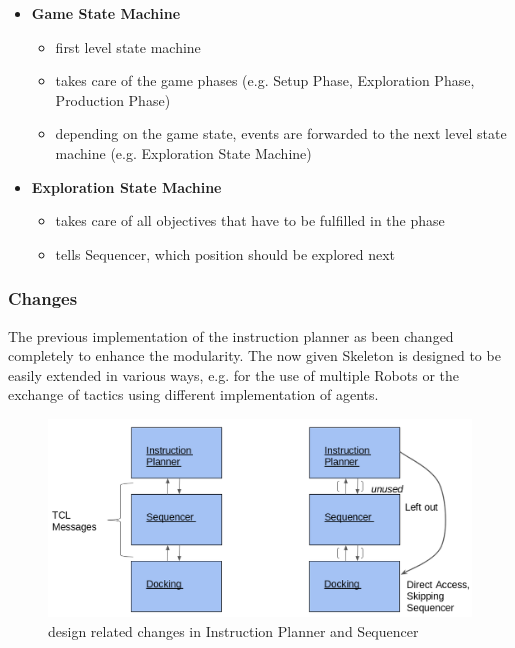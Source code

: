 \begin{itemize}
    \item \textbf{Game State Machine}
    \begin{itemize}
        \item first level state machine
        \item takes care of the game phases (e.g. Setup Phase, Exploration Phase, Production Phase)
         \item depending on the game state, events are forwarded to the next level state machine (e.g. Exploration State Machine)
    \end{itemize}
    \item \textbf{Exploration State Machine}
    \begin{itemize}
        \item takes care of all objectives that have to be fulfilled in the phase
        \item tells Sequencer, which position should be explored next
    \end{itemize}
\end{itemize}
\newpage

\subsubsection{Changes}
The previous implementation of the instruction planner as been changed completely to enhance the modularity.
The now given Skeleton is designed to be easily extended in various ways, e.g. for the use of multiple Robots
or the exchange of tactics using different implementation of agents. \\

\begin{figure}[h]
\centering
\includegraphics[scale=0.4]{pic/oldUse_Instructionplanner.png}
\caption{design related changes in Instruction Planner and Sequencer}
\label{fig:changes_instruction}
\end{figure}

